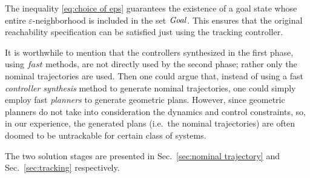 The inequality \eqref{eq:choice of eps} guarantees the existence of a goal state whose entire $\varepsilon$-neighborhood is included in the set $\mathit{Goal}$.
This ensures that the original reachability specification can be satisfied just using the tracking controller.

It is worthwhile to mention that the controllers synthesized in the first phase, using $\mathit{fast}$ methods, are not directly used by the second phase; rather only the nominal trajectories are used.
Then one could argue that, instead of using a fast \emph{controller synthesis} method to generate nominal trajectories, one could simply employ fast \emph{planners} \cite{rrt etc.} to generate geometric plans.
However, since geometric planners do not take into consideration the dynamics and control constraints, so, in our experience, the generated plans (i.e.\ the nominal trajectories) are often doomed to be untrackable for certain class of systems.


The two solution stages are presented in Sec.~\ref{sec:nominal trajectory} and Sec.~\ref{sec:tracking} respectively.







